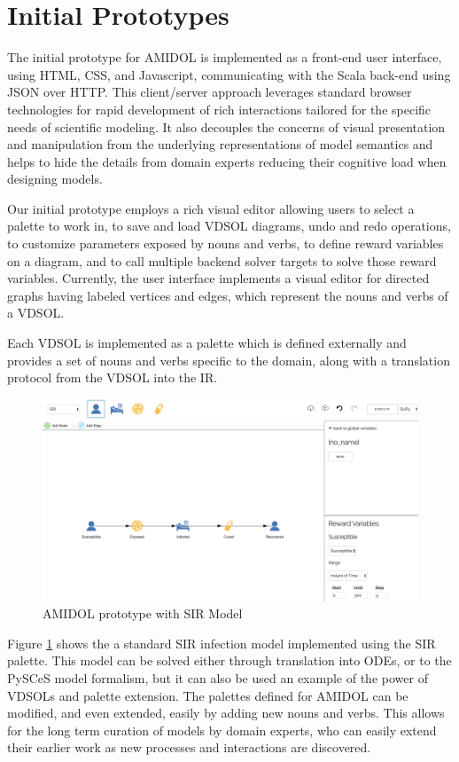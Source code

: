 \documentclass[11pt]{article}
\newcommand{\amidol}{\textsc{AMIDOL}}
\begin{document}
\section{Initial Prototypes}

The initial prototype for \amidol{} is implemented as a front-end user
interface, using HTML, CSS, and Javascript, communicating with the
Scala back-end using JSON over HTTP.  This client/server approach
leverages standard browser technologies for rapid development of rich
interactions tailored for the specific needs of scientific
modeling. It also decouples the concerns of visual presentation and
manipulation from the underlying representations of model semantics
and helps to hide the details from domain experts reducing their
cognitive load when designing models.

Our initial prototype employs a rich visual editor allowing users to
select a palette to work in, to save and load VDSOL diagrams, undo and
redo operations, to customize parameters exposed by nouns and verbs,
to define reward variables on a diagram, and to call multiple backend
solver targets to solve those reward variables. Currently, the user
interface implements a visual editor for directed graphs having
labeled vertices and edges, which represent the nouns and verbs of a
VDSOL.

Each VDSOL is implemented as a palette which is defined externally and
provides a set of nouns and verbs specific to the domain, along with a
translation protocol from the VDSOL into the IR.

\begin{figure}
  \includegraphics[width=\textwidth]{figs/SIR.png}
  \caption{\amidol{} prototype with SIR Model}
\label{Fig:SIR-Proto}
\end{figure}

Figure \ref{Fig:SIR-Proto} shows the a standard SIR infection model
implemented using the SIR palette.  This model can be solved either
through translation into ODEs, or to the PySCeS model formalism, but
it can also be used an example of the power of VDSOLs and palette
extension.  The palettes defined for \amidol{} can be modified, and
even extended, easily by adding new nouns and verbs.  This allows for
the long term curation of models by domain experts, who can easily
extend their earlier work as new processes and interactions are
discovered.
\end{document}
